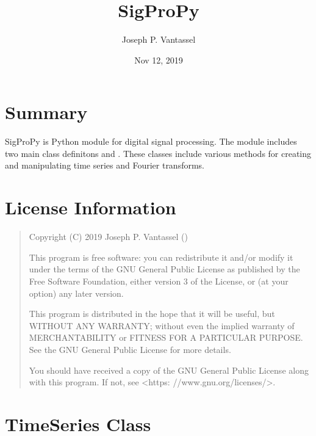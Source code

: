 \documentclass[letterpaper,10pt,english,openany,oneside]{sphinxmanual}
\title{SigProPy}
\date{Nov 12, 2019}
\author{Joseph P.\@{} Vantassel}
\begin{document}
\pagestyle{empty}
\sphinxmaketitle
\pagestyle{plain}
\sphinxtableofcontents
\pagestyle{normal}
\label{\detokenize{index::doc}}



\chapter{Summary}
\label{\detokenize{index:summary}}
SigProPy is Python module for digital signal processing. The module includes
two main class definitons  and . These classes
include various methods for creating and manipulating time series and Fourier
transforms.


\chapter{License Information}
\label{\detokenize{index:license-information}}\begin{quote}

Copyright (C) 2019 Joseph P. Vantassel ()

This program is free software: you can redistribute it and/or modify
it under the terms of the GNU General Public License as published by
the Free Software Foundation, either version 3 of the License, or
(at your option) any later version.

This program is distributed in the hope that it will be useful,
but WITHOUT ANY WARRANTY; without even the implied warranty of
MERCHANTABILITY or FITNESS FOR A PARTICULAR PURPOSE.  See the
GNU General Public License for more details.

You should have received a copy of the GNU General Public License
along with this program.  If not, see \textless{}https: //www.gnu.org/licenses/\textgreater{}.
\end{quote}


\chapter{TimeSeries Class}
\label{\detokenize{index:timeseries-class}}
\end{document}
